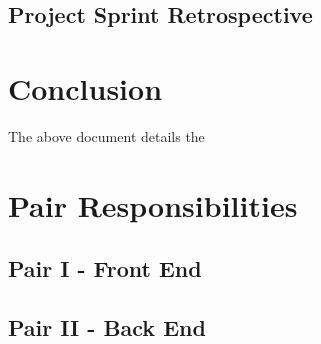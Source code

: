 \documentclass{article}
\begin{document}
\subsection{Project Sprint Retrospective}

\section{Conclusion}
The above document details the 

\appendix
\section{Pair Responsibilities}

\subsection{Pair I - Front End}

\subsection{Pair II - Back End}
\end{document}
